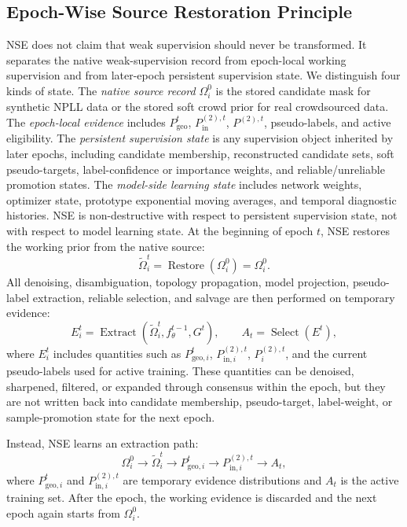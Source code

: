 \subsection{Epoch-Wise Source Restoration Principle}
NSE does not claim that weak supervision should never be transformed. It
separates the native weak-supervision record from epoch-local working
supervision and from later-epoch persistent supervision state. We distinguish
four kinds of state. The \emph{native source record} $\Omega_i^0$ is the stored
candidate mask for synthetic NPLL data or the stored soft crowd prior for real
crowdsourced data. The \emph{epoch-local evidence} includes
$P_{\mathrm{geo}}^t$, $P_{\mathrm{in}}^{(2),t}$, $P^{(2),t}$, pseudo-labels,
and active eligibility. The \emph{persistent supervision state} is any
supervision object inherited by later epochs, including candidate membership,
reconstructed candidate sets, soft pseudo-targets, label-confidence or
importance weights, and reliable/unreliable promotion states. The
\emph{model-side learning state} includes network weights, optimizer state,
prototype exponential moving averages, and temporal diagnostic histories. NSE is
non-destructive with respect to persistent supervision state, not with respect to
model learning state. At the beginning of epoch $t$, NSE restores the working
prior from the native source:
\begin{equation}
    \tilde{\Omega}_i^t
    =
    \operatorname{Restore}(\Omega_i^0)
    =
    \Omega_i^0 .
    \label{eq:fixed_source}
\end{equation}
All denoising, disambiguation, topology propagation, model projection,
pseudo-label extraction, reliable selection, and salvage are then performed on
temporary evidence:
\begin{equation}
    E_i^t
    =
    \operatorname{Extract}
    \left(
    \tilde{\Omega}_i^t,
    f_{\theta}^{t-1},
    G^t
    \right),
    \qquad
    A_t=\operatorname{Select}(E^t),
    \label{eq:epoch_extract}
\end{equation}
where $E_i^t$ includes quantities such as $P_{\mathrm{geo},i}^t$,
$P_{\mathrm{in},i}^{(2),t}$, $P_i^{(2),t}$, and the current pseudo-labels used
for active training. These quantities can be denoised, sharpened, filtered, or
expanded through consensus within the epoch, but they are not written back into
candidate membership, pseudo-target, label-weight, or sample-promotion state for
the next epoch.

Instead, NSE learns an extraction path:
\begin{equation}
    \Omega_i^0
    \rightarrow
    \tilde{\Omega}_i^t
    \rightarrow
    P_{\mathrm{geo},i}^t
    \rightarrow
    P_{\mathrm{in},i}^{(2),t}
    \rightarrow
    A_t,
    \label{eq:extraction_path}
\end{equation}
where $P_{\mathrm{geo},i}^t$ and $P_{\mathrm{in},i}^{(2),t}$ are temporary
evidence distributions and $A_t$ is the active training set. After the epoch,
the working evidence is discarded and the next epoch again starts from
$\Omega_i^0$.

